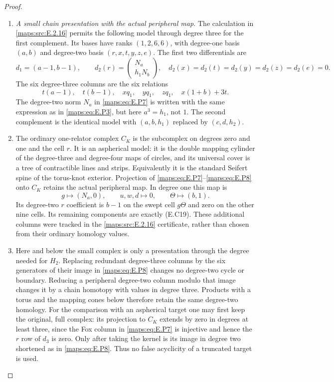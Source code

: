 \begin{proof}
\begin{enumerate}[label=\arabic*.,leftmargin=*]
\item \emph{A small chain presentation with the actual peripheral map.}
The calculation in \ref{maps:src:E.2.16} permits the following model
through degree three for the first complement. Its
bases have ranks $(1,2,6,6)$, with degree-one basis
$(a,b)$ and degree-two basis $(r,x,t,y,z,e)$.
The first two differentials are
\[
 d_1=(a-1,b-1),\qquad
 d_2(r)=\begin{pmatrix}N_a\\h_1N_b\end{pmatrix},
 \quad d_2(x)=d_2(t)=d_2(y)=d_2(z)=d_2(e)=0.
 \tag{E.P7}\label{maps:eq:E.P7}
\]
The six degree-three columns are the six relations
\[
 t(a-1),\quad t(b-1),\quad xq_1,\quad yq_1,\quad zq_1,
                         \quad x(1+b)+3t.
 \tag{E.P8}\label{maps:eq:E.P8}
\]
The degree-two norm $N_a$ in \eqref{maps:eq:E.P7} is written with
the same expression as in \eqref{maps:eq:E.P3}, but here $a^3=h_1$,
not $1$. The second complement is the identical
model with $(a,b,h_1)$ replaced by $(c,d,h_2)$.

\item The ordinary one-relator complex $C_K$ is the subcomplex
on degrees zero and one and the cell $r$. It is an
aspherical model: it is the double mapping cylinder
of the degree-three and degree-four maps of circles,
and its universal cover is a tree of contractible
lines and strips. Equivalently it is the standard
Seifert spine of the torus-knot exterior. Projection
of \eqref{maps:eq:E.P7}--\eqref{maps:eq:E.P8} onto $C_K$ retains the actual
peripheral map. In degree one this map is
\[
 g\longmapsto(N_a,0),\qquad
 u,w,d\longmapsto0,\qquad
 \Theta\longmapsto(b,1).
 \tag{E.P9}\label{maps:eq:E.P9}
\]
Its degree-two $r$ coefficient is $b-1$ on the swept
cell $g\Theta$ and zero on the other nine cells.
Its remaining components are exactly (E.C19).
These additional columns were tracked in the
\ref{maps:src:E.2.16} certificate, rather than chosen from their
ordinary homology values.

\item Here and below the small complex is only a
presentation through the degree needed for $H_2$.
Replacing redundant degree-three columns by the six
generators of their image in \eqref{maps:eq:E.P8} changes no
degree-two cycle or boundary. Reducing a peripheral
degree-two column modulo that image changes it by
a chain homotopy with values in degree three.
Products with a torus and the mapping cones below
therefore retain the same degree-two homology.
For the comparison with an aspherical target one
may first keep the original, full complex: its
projection to $C_K$ extends by zero in degrees at
least three, since the Fox column in \eqref{maps:eq:E.P7} is
injective and hence the $r$ row of $d_3$ is zero.
Only after taking the kernel is its image in degree
two shortened as in \eqref{maps:eq:E.P8}. Thus no false
acyclicity of a truncated target is used.


\end{enumerate}
\end{proof}
